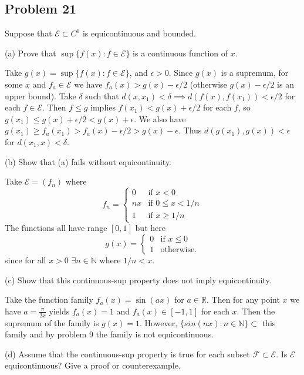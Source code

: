 \documentclass{amsart}
\begin{document}
\newpage

\subsection*{Problem 21} Suppose that \( \mathcal{E} \subset C^0 \) is equicontinuous and bounded.

(a) Prove that \( \sup \{ f(x) : f \in \mathcal{E} \} \) is a continuous function of \( x \).

\medskip \noindent Take $g(x) = \sup\{f(x): f\in \mathcal{E}\}$, and $\epsilon>0$. Since $g(x)$ is
a supremum, for some $x$ and $f_a\in\mathcal{E}$ we have $f_a(x)>g(x)-\epsilon/2$ (otherwise $g(x)-\epsilon/2$ is an upper bound).
Take $\delta$ such that $d(x, x_1)<\delta\implies d(f(x), f(x_1))<\epsilon/2$ for each $f\in\mathcal{E}$. Then $f\leq g$ implies $f(x_1)<g(x)+\epsilon/2$
for each $f$, so $g(x_1)\leq g(x)+\epsilon/2<g(x)+\epsilon$. We also have $g(x_1)\geq f_a(x_1)>f_a(x)-\epsilon/2>g(x)-\epsilon$. Thus $d(g(x_1), g(x))<\epsilon$
for $d(x_1, x)<\delta$.


\bigskip

(b) Show that (a) fails without equicontinuity.

\medskip \noindent Take $\mathcal{E} = (f_n)$ where \[f_n=\begin{cases}
    0 & \text{if } x<0\\
    nx & \text{if } 0\leq x < 1/n\\
    1 & \text{if } x\geq1/n
\end{cases}\]
The functions all have range $[0, 1]$ but here \[g(x) =\begin{cases}
    0 & \text{if } x\leq 0 \\
    1 & \text{otherwise.}
\end{cases}\]
since for all $x>0$ $\exists n\in\mathbb{N}$ where $1/n<x$. 

\bigskip

(c) Show that this continuous-sup property does not imply equicontinuity.

\medskip \noindent Take the function family $f_a(x) = \sin(ax)$ for $a\in\mathbb{R}$. Then for any point
$x$ we have $a=\frac{\pi}{2x}$ yields $f_a(x)=1$ and $f_a(x)\in [-1, 1]$ for each $x$. Then the supremum
of the family is $g(x)=1$. However, $\{sin(nx): n\in\mathbb{N}\}\subset$ this family and by problem 9 the 
family is not equicontinuous.

\bigskip

(d) Assume that the continuous-sup property is true for each subset \( \mathcal{F} \subset \mathcal{E} \). Is \( \mathcal{E} \) equicontinuous? Give a proof or counterexample.
\end{document}
